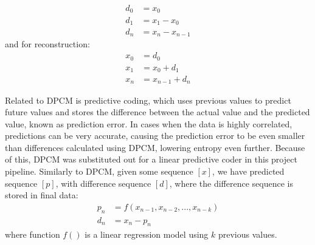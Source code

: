 \begin{equation}
\begin{split}
d_0 & = x_0 \\
d_1 & = x_1 - x_0 \\
d_{n} & = x_{n} - x_{n-1}
\end{split}
\end{equation}
and for reconstruction:
\begin{equation}
\begin{split}
x_0 & = d_0 \\
x_1 & = x_0 + d_1 \\
x_n & = x_{n-1} + d_n
\end{split}
\end{equation}

Related to DPCM is predictive coding, which uses previous values to predict future values and stores the difference between the actual value and the predicted value, known as prediction error. In cases when the data is highly correlated, predictions can be very accurate, causing the prediction error to be even smaller than differences calculated using DPCM, lowering entropy even further. Because of this, DPCM was substituted out for a linear predictive coder in this project pipeline. Similarly to DPCM, given some sequence $[x]$, we have predicted sequence $[p]$, with difference sequence $[d]$, where the difference sequence is stored in final data:
\begin{equation}
\begin{split}
p_n & = f(x_{n-1}, x_{n-2},...,x_{n-k}) \\
d_{n} & = x_{n} - p_n
\end{split}
\end{equation}
where function $f()$ is a linear regression model using $k$ previous values.